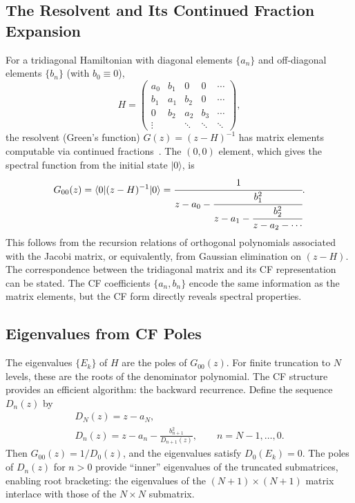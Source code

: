 \documentclass[reprint, floatfix, superscriptaddress, amsmath, amssymb, longbibliography]{revtex4-2}
\begin{document}
\subsection{The Resolvent and Its Continued Fraction Expansion}
\label{sec:resolvent_cf}

For a tridiagonal Hamiltonian with diagonal elements $\{a_n\}$ and off-diagonal elements $\{b_n\}$ (with $b_0 \equiv 0$),
\begin{equation}
H = \begin{pmatrix}
a_0 & b_1 & 0 & 0 & \cdots \\
b_1 & a_1 & b_2 & 0 & \cdots \\
0 & b_2 & a_2 & b_3 & \cdots \\
\vdots & & \ddots & \ddots & \ddots
\end{pmatrix},
\label{eq:jacobi}
\end{equation}
the resolvent (Green's function) $G(z) = (z - H)^{-1}$ has matrix elements computable via continued fractions~\cite{Stieltjes1894, Chihara1978, Simon2005OPUC}. The $(0,0)$ element, which gives the spectral function from the initial state $|0\rangle$, is
\begin{equation}
G_{00}(z) = \langle 0|(z-H)^{-1}|0\rangle = \cfrac{1}{z - a_0 - \cfrac{b_1^2}{z - a_1 - \cfrac{b_2^2}{z - a_2 - \cdots}}}.
\label{eq:cf_resolvent}
\end{equation}
This follows from the recursion relations of orthogonal polynomials associated with the Jacobi matrix, or equivalently, from Gaussian elimination on $(z-H)$. The correspondence between the tridiagonal matrix and its CF representation can be stated. The CF coefficients $\{a_n, b_n\}$ encode the same information as the matrix elements, but the CF form directly reveals spectral properties.


\subsection{Eigenvalues from CF Poles}
\label{sec:eigenvalues}

The eigenvalues $\{E_k\}$ of $H$ are the poles of $G_{00}(z)$. For finite truncation to $N$ levels, these are the roots of the denominator polynomial. The CF structure provides an efficient algorithm: the backward recurrence. Define the sequence $D_n(z)$ by
\begin{multline}
D_N(z) = z - a_N, \\
D_n(z) = z - a_n - \frac{b_{n+1}^2}{D_{n+1}(z)}, 
\qquad n = N-1, \ldots, 0 .
\label{eq:backward_recurrence}
\end{multline}
Then $G_{00}(z) = 1/D_0(z)$, and the eigenvalues satisfy $D_0(E_k) = 0$. The poles of $D_n(z)$ for $n > 0$ provide ``inner'' eigenvalues of the truncated submatrices, enabling root bracketing: the eigenvalues of the $(N+1) \times (N+1)$ matrix interlace with those of the $N \times N$ submatrix.
\end{document}
